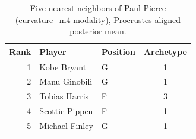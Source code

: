 \begin{table}[htbp]
  \centering\small
  \begin{tabular}{rllc}
    \toprule
    Rank & Player & Position & Archetype \\
    \midrule
    1 & Kobe Bryant & G & 1 \\
    2 & Manu Ginobili & G & 1 \\
    3 & Tobias Harris & F & 3 \\
    4 & Scottie Pippen & F & 1 \\
    5 & Michael Finley & G & 1 \\
    \bottomrule
  \end{tabular}
  \caption{Five nearest neighbors of Paul Pierce (curvature_m4 modality), Procrustes-aligned posterior mean.}
  \label{tab:Paul_Pierce_neighbors_curvature_m4}
\end{table}

